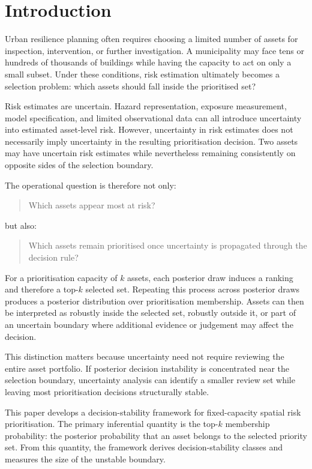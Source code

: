 \documentclass[
]{article}
\begin{document}
\section{Introduction}\label{introduction}

Urban resilience planning often requires choosing a limited number of
assets for inspection, intervention, or further investigation. A
municipality may face tens or hundreds of thousands of buildings while
having the capacity to act on only a small subset. Under these
conditions, risk estimation ultimately becomes a selection problem:
which assets should fall inside the prioritised set?

Risk estimates are uncertain. Hazard representation, exposure
measurement, model specification, and limited observational data can all
introduce uncertainty into estimated asset-level risk. However,
uncertainty in risk estimates does not necessarily imply uncertainty in
the resulting prioritisation decision. Two assets may have uncertain
risk estimates while nevertheless remaining consistently on opposite
sides of the selection boundary.

The operational question is therefore not only:

\begin{quote}
Which assets appear most at risk?
\end{quote}

but also:

\begin{quote}
Which assets remain prioritised once uncertainty is propagated through
the decision rule?
\end{quote}

For a prioritisation capacity of \(k\) assets, each posterior draw
induces a ranking and therefore a top-\(k\) selected set. Repeating this
process across posterior draws produces a posterior distribution over
prioritisation membership. Assets can then be interpreted as robustly
inside the selected set, robustly outside it, or part of an uncertain
boundary where additional evidence or judgement may affect the decision.

This distinction matters because uncertainty need not require reviewing
the entire asset portfolio. If posterior decision instability is
concentrated near the selection boundary, uncertainty analysis can
identify a smaller review set while leaving most prioritisation
decisions structurally stable.

This paper develops a decision-stability framework for fixed-capacity
spatial risk prioritisation. The primary inferential quantity is the
top-\(k\) membership probability: the posterior probability that an
asset belongs to the selected priority set. From this quantity, the
framework derives decision-stability classes and measures the size of
the unstable boundary.
\end{document}
